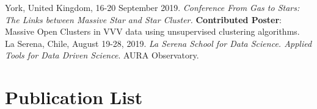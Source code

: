 \documentclass[11pt, a4paper]{article}
\begin{document}
York, United Kingdom, 16-20 September 2019. \textit{Conference From Gas to Stars: The Links between Massive Star and Star Cluster.} \textbf{Contributed Poster}: Massive Open Clusters in VVV data using unsupervised clustering algorithms.\\
 
La Serena, Chile, August 19-28, 2019. \textit{La Serena School for Data Science. Applied Tools for Data Driven Science}. AURA Observatory.\\


\section*{Publication List}
\end{document}
